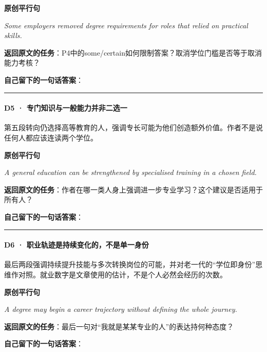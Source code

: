 \documentclass[
  11pt,
]{ctexart}
\renewenvironment{quote}{\begin{tcolorbox}[enhanced,breakable,colback=sand,colframe=primary!22,boxrule=0.4pt,arc=2pt,left=2.6mm,right=2.6mm,top=1.6mm,bottom=1.6mm]\itshape}{\end{tcolorbox}}
\begin{document}
\textbf{原创平行句}

\begin{quote}
Some employers removed degree requirements for roles that relied on
practical skills.
\end{quote}

\textbf{返回原文的任务}：P4中的some/certain如何限制答案？取消学位门槛是否等于取消能力考核？

\textbf{自己留下的一句话答案}：

\rule{0.75\linewidth}{0.35pt}

\paragraph{D5 ·
专门知识与一般能力并非二选一}\label{d5-ux4e13ux95e8ux77e5ux8bc6ux4e0eux4e00ux822cux80fdux529bux5e76ux975eux4e8cux9009ux4e00}

第五段转向仍选择高等教育的人，强调专长可能为他们创造额外价值。作者不是说任何人都应该连读两个学位。

\textbf{原创平行句}

\begin{quote}
A general education can be strengthened by specialised training in a
chosen field.
\end{quote}

\textbf{返回原文的任务}：作者在哪一类人身上强调进一步专业学习？这个建议是否适用于所有人？

\textbf{自己留下的一句话答案}：

\rule{0.75\linewidth}{0.35pt}

\paragraph{D6 ·
职业轨迹是持续变化的，不是单一身份}\label{d6-ux804cux4e1aux8f68ux8ff9ux662fux6301ux7eedux53d8ux5316ux7684ux4e0dux662fux5355ux4e00ux8eabux4efd}

最后两段强调持续提升技能与多次转换岗位的可能，并对老一代的``学位即身份''思维作对照。就业数字是文章使用的估计，不是个人必然会经历的次数。

\textbf{原创平行句}

\begin{quote}
A degree may begin a career trajectory without defining the whole
journey.
\end{quote}

\textbf{返回原文的任务}：最后一句对``我就是某某专业的人''的表达持何种态度？

\textbf{自己留下的一句话答案}：
\end{document}
